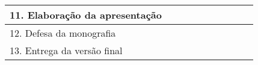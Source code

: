 \begin{quadro}[!htb]
\begin{tabular}{|l|l|l|l|l|l|l|l|l|l|}
{\color[HTML]{333333} 11. Elaboração da apresentação}                                                                      & {\color[HTML]{333333} }                                  & {\color[HTML]{333333} }                                  & {\color[HTML]{333333} }                                  & {\color[HTML]{333333} }                                  & {\color[HTML]{333333} }                                  & {\color[HTML]{333333} }                                  & {\color[HTML]{333333} }                                  & {\color[HTML]{333333} }                                  & \cellcolor[HTML]{9B9B9B}{\color[HTML]{333333} }          \\ \hline
{\color[HTML]{333333} 12. Defesa da monografia}                                                                            & {\color[HTML]{333333} }                                  & {\color[HTML]{333333} }                                  & {\color[HTML]{333333} }                                  & {\color[HTML]{333333} }                                  & {\color[HTML]{333333} }                                  & {\color[HTML]{333333} }                                  & {\color[HTML]{333333} }                                  & {\color[HTML]{333333} }                                  & \cellcolor[HTML]{9B9B9B}{\color[HTML]{333333} }          \\ \hline
{\color[HTML]{333333} 13. Entrega da versão final}                                                                         & {\color[HTML]{333333} }                                  & {\color[HTML]{333333} }                                  & {\color[HTML]{333333} }                                  & {\color[HTML]{333333} }                                  & {\color[HTML]{333333} }                                  & {\color[HTML]{333333} }                                  & {\color[HTML]{333333} }                                  & {\color[HTML]{333333} }                                  & \cellcolor[HTML]{9B9B9B}{\color[HTML]{333333} }          \\ \hline
\end{tabular}
\end{quadro}